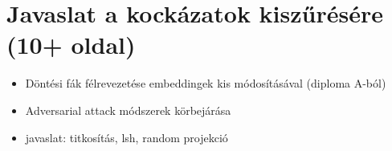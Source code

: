 \section{Javaslat a kockázatok kiszűrésére (10+ oldal)}

\begin{itemize}
	\item Döntési fák félrevezetése embeddingek kis módosításával (diploma A-ból)
	\item Adversarial attack módszerek körbejárása
	\item javaslat: titkosítás, lsh, random projekció %
\end{itemize}